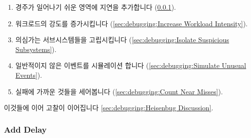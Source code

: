 \begin{enumerate}
\item	경주가 일어나기 쉬운 영역에 지연을 추가합니다
	(\cref{sec:debugging:Add Delay}).
\item	워크로드의 강도를 증가시킵니다
	(\cref{sec:debugging:Increase Workload Intensity}).
\item	의심가는 서브시스템들을 고립시킵니다
	(\cref{sec:debugging:Isolate Suspicious Subsystems}).
\item	일반적이지 않은 이벤트를 시뮬레이션 합니다
	(\cref{sec:debugging:Simulate Unusual Events}).
\item	실패에 가까운 것들을 세어봅니다
	(\cref{sec:debugging:Count Near Misses}).

\end{enumerate}

이것들에 이어 고찰이 이어집니다
\cref{sec:debugging:Heisenbug Discussion}.

\subsubsection{Add Delay}
\label{sec:debugging:Add Delay}

